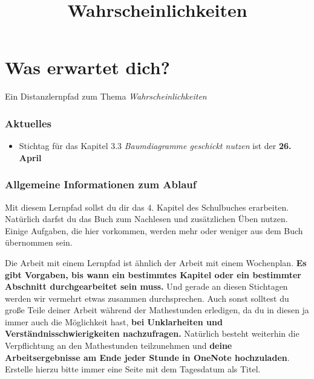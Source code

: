 \documentclass[
  ngerman,
]{book}
\title{Wahrscheinlichkeiten}
\author{}
\date{\vspace{-2.5em}}
\providecommand{\tightlist}{%
  \setlength{\itemsep}{0pt}\setlength{\parskip}{0pt}}
\begin{document}
\maketitle

{
\setcounter{tocdepth}{1}
\tableofcontents
}
\hypertarget{was-erwartet-dich}{%
\chapter*{Was erwartet dich?}\label{was-erwartet-dich}}

Ein Distanzlernpfad zum Thema \emph{Wahrscheinlichkeiten}

\hypertarget{aktuelles}{%
\subsection*{Aktuelles}\label{aktuelles}}

\begin{itemize}
\tightlist
\item
  Stichtag für das Kapitel 3.3 \emph{Baumdiagramme geschickt nutzen} ist der \textbf{26. April}
\end{itemize}

\hypertarget{allgemeine-informationen-zum-ablauf}{%
\subsection*{Allgemeine Informationen zum Ablauf}\label{allgemeine-informationen-zum-ablauf}}

Mit diesem Lernpfad sollst du dir das 4. Kapitel des Schulbuches erarbeiten. Natürlich darfst du das Buch zum Nachlesen und zusätzlichen Üben nutzen. Einige Aufgaben, die hier vorkommen, werden mehr oder weniger aus dem Buch übernommen sein.

Die Arbeit mit einem Lernpfad ist ähnlich der Arbeit mit einem Wochenplan. \textbf{Es gibt Vorgaben, bis wann ein bestimmtes Kapitel oder ein bestimmter Abschnitt durchgearbeitet sein muss.} Und gerade an diesen Stichtagen werden wir vermehrt etwas zusammen durchsprechen. Auch sonst solltest du große Teile deiner Arbeit während der Mathestunden erledigen, da du in diesen ja immer auch die Möglichkeit hast, \textbf{bei Unklarheiten und Verständnisschwierigkeiten nachzufragen.} Natürlich besteht weiterhin die Verpflichtung an den Mathestunden teilzunehmen und \textbf{deine Arbeitsergebnisse am Ende jeder Stunde in OneNote hochzuladen}. Erstelle hierzu bitte immer eine Seite mit dem Tagesdatum als Titel.
\end{document}
